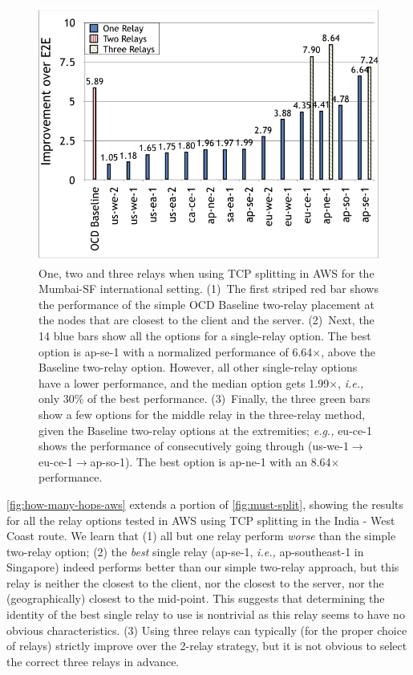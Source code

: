 \documentclass[newfonts=false,format=sigconf,10pt,letterpaper]{acmart}
\providecommand{\ie}{\emph{i.e.,} }
\providecommand{\eg}{\emph{e.g.,} }
\begin{document}
\begin{figure}
  \centering
    \includegraphics[width=\columnwidth,trim=2mm 5mm 1mm 5mm,clip]{figures/hops.png}
    \caption{One, two and three relays when using TCP splitting in AWS for the Mumbai-SF international setting. (1)~The first striped red bar shows the performance of the simple OCD Baseline two-relay placement at the nodes that are closest to the client and the server. (2)~Next, the 14 blue bars show all the options for a single-relay option. The best option is ap-se-1 with a normalized performance of 6.64$\times$, above the Baseline two-relay option. However, all other single-relay options have a lower performance, and the median option gets 1.99$\times$, \ie only 30\% of the best performance. (3)~Finally, the three green bars show a few options for the middle relay in the three-relay method, given the Baseline two-relay options at the extremities; \eg eu-ce-1 shows the performance of consecutively going through (us-we-1$\to$eu-ce-1$\to$ap-so-1). The best option is ap-ne-1 with an 8.64$\times$ performance. } 
    \label{fig:how-many-hops-aws}
\end{figure}

\autoref{fig:how-many-hops-aws} extends a portion of \autoref{fig:must-split}, showing the results for all the relay options tested in AWS using TCP splitting in the India - West Coast route. 
We learn that (1) all but one relay perform \emph{worse} than the simple two-relay option; (2) the \emph{best} single relay (ap-se-1, \ie ap-southeast-1 in Singapore) indeed performs better than our simple two-relay approach, but this relay is neither the closest to the client, nor the closest to the server, nor the (geographically) closest to the mid-point. 
This suggests that determining the identity of the best single relay to use is nontrivial as this relay seems to have no obvious characteristics. 
(3) Using three  relays can typically (for the proper choice of relays) strictly improve over the 2-relay strategy, but it is not obvious to select the correct three relays in advance.
\end{document}
